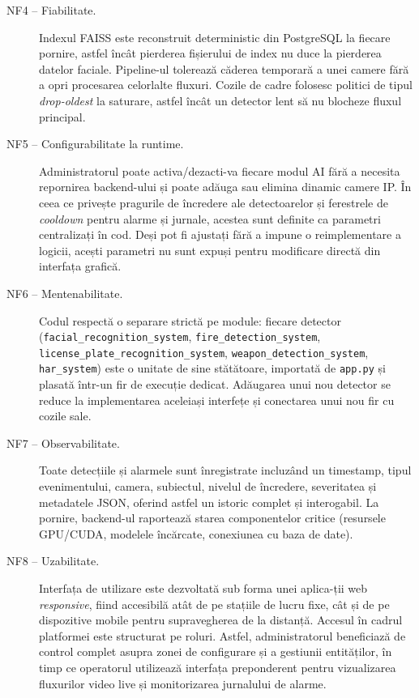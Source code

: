 \documentclass[../../main.tex]{subfiles}
\begin{document}
\begin{description}
    \item[NF4 -- Fiabilitate.] Indexul FAISS este reconstruit deterministic din \linebreak PostgreSQL la fiecare pornire, astfel încât pierderea fișierului de index nu duce la pierderea datelor faciale. Pipeline-ul tolerează căderea temporară a unei camere fără a opri procesarea celorlalte fluxuri. Cozile de cadre folosesc politici de tipul \emph{drop-oldest} la saturare, astfel încât un detector lent să nu blocheze fluxul principal.

    \item[NF5 -- Configurabilitate la runtime.] Administratorul poate activa/dezacti-va fiecare modul AI fără a necesita repornirea backend-ului și poate adăuga sau elimina dinamic camere IP. În ceea ce privește pragurile de încredere ale detectoarelor și ferestrele de \emph{cooldown} pentru alarme și jurnale, acestea sunt definite ca parametri centralizați în cod. Deși pot fi ajustați fără a impune o reimplementare a logicii, acești parametri nu sunt expuși pentru modificare directă din interfața grafică.

    \item[NF6 -- Mentenabilitate.] Codul respectă o separare strictă pe module: fiecare detector (\texttt{facial\_recognition\_system}, \texttt{fire\_detection\_system}, \linebreak \texttt{license\_plate\_recognition\_system}, \texttt{weapon\_detection\_system}, \linebreak \texttt{har\_system}) este o unitate de sine stătătoare, importată de \texttt{app.py} și plasată într-un fir de execuție dedicat. Adăugarea unui nou detector se reduce la implementarea aceleiași interfețe și conectarea unui nou fir cu cozile sale.

    \item[NF7 -- Observabilitate.] Toate detecțiile și alarmele sunt înregistrate incluzând un timestamp, tipul evenimentului, camera, subiectul, nivelul de încredere, severitatea și metadatele JSON, oferind astfel un istoric complet și interogabil. La pornire, backend-ul raportează starea componentelor critice (resursele GPU/CUDA, modelele încărcate, conexiunea cu baza de date).

    \item[NF8 -- Uzabilitate.] Interfața de utilizare este dezvoltată sub forma unei aplica-ții web \emph{responsive}, fiind accesibilă atât de pe stațiile de lucru fixe, cât și de pe dispozitive mobile pentru supravegherea de la distanță. Accesul în cadrul platformei este structurat pe roluri. Astfel, administratorul beneficiază de control complet asupra zonei de configurare și a gestiunii entităților, în timp ce operatorul utilizează interfața preponderent pentru vizualizarea fluxurilor video live și monitorizarea jurnalului de alarme.


\end{description}
\end{document}
